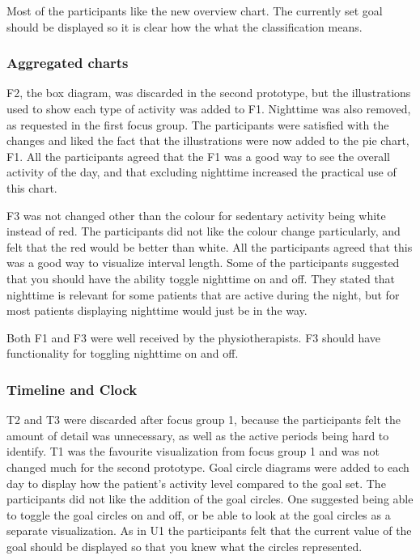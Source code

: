 Most of the participants like the new overview chart. The currently set goal should be displayed so it is clear how the what the classification means.

\subsubsection{Aggregated charts}
F2, the box diagram, was discarded in the second prototype, but the illustrations used to show each type of activity was added to F1. Nighttime was also removed, as requested in the first focus group. The participants were satisfied with the changes and liked the fact that the illustrations were now added to the pie chart, F1. All the participants agreed that the F1 was a good way to see the overall activity of the day, and that excluding nighttime increased the practical use of this chart.

F3 was not changed other than the colour for sedentary activity being white instead of red. The participants did not like the colour change particularly, and felt that the red would be better than white. All the participants agreed that this was a good way to visualize interval length. Some of the participants suggested that you should have the ability toggle nighttime on and off. They stated that nighttime is relevant for some patients that are active during the night, but for most patients displaying nighttime would just be in the way.

Both F1 and F3 were well received by the physiotherapists. F3 should have functionality for toggling nighttime on and off.

\subsubsection{Timeline and Clock}
T2 and T3 were discarded after focus group 1, because the participants felt the amount of detail was unnecessary, as well as the active periods being hard to identify. T1 was the favourite visualization from focus group 1 and was not changed much for the second prototype. Goal circle diagrams were added to each day to display how the patient's activity level compared to the goal set. The participants did not like the addition of the goal circles. One suggested being able to toggle the goal circles on and off, or be able to look at the goal circles as a separate visualization. As in U1 the participants felt that the current value of the goal should be displayed so that you knew what the circles represented.

